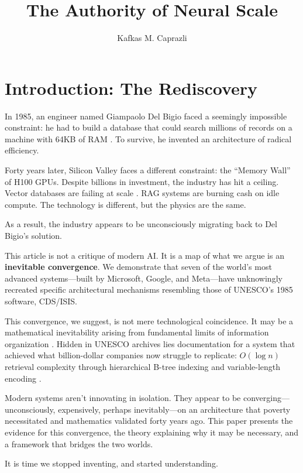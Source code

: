 \documentclass[manuscript,screen,nonacm]{acmart}
\title{The Authority of Neural Scale}
\author{Kafkas M. Caprazli}
\affiliation{%
  \institution{Independent Researcher}
  \city{Wolfsburg}
  \country{Germany}
}
\begin{document}
\maketitle

\section{Introduction: The Rediscovery}

In 1985, an engineer named Giampaolo Del Bigio faced a seemingly impossible constraint: he had to build a database that could search millions of records on a machine with 64KB of RAM \cite{delbigio1995}. To survive, he invented an architecture of radical efficiency.

Forty years later, Silicon Valley faces a different constraint: the ``Memory Wall'' of H100 GPUs. Despite billions in investment, the industry has hit a ceiling. Vector databases are failing at scale \cite{bruckhaus2024}. RAG systems are burning cash on idle compute. The technology is different, but the physics are the same.

As a result, the industry appears to be unconsciously migrating back to Del Bigio's solution.

This article is not a critique of modern AI. It is a map of what we argue is an \textbf{inevitable convergence}. We demonstrate that seven of the world's most advanced systems---built by Microsoft, Google, and Meta---have unknowingly recreated specific architectural mechanisms resembling those of UNESCO's 1985 software, CDS/ISIS.

This convergence, we suggest, is not mere technological coincidence. It may be a mathematical inevitability arising from fundamental limits of information organization \cite{weller2025}. Hidden in UNESCO archives lies documentation for a system that achieved what billion-dollar companies now struggle to replicate: $O(\log n)$ retrieval complexity through hierarchical B-tree indexing and variable-length encoding \cite{unesco1989}.

Modern systems aren't innovating in isolation. They appear to be converging---unconsciously, expensively, perhaps inevitably---on an architecture that poverty necessitated and mathematics validated forty years ago. This paper presents the evidence for this convergence, the theory explaining why it may be necessary, and a framework that bridges the two worlds.

It is time we stopped inventing, and started understanding.
\end{document}

